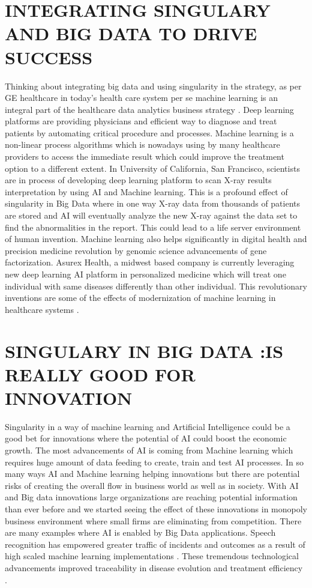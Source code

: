 \documentclass[sigconf]{acmart}
\begin{document}
\section{INTEGRATING SINGULARY AND BIG DATA TO DRIVE SUCCESS}
Thinking about integrating big data and using singularity in the strategy, as per GE healthcare in today’s health care system per se machine learning is an integral part of the healthcare data analytics business strategy \cite{editor02}. Deep learning platforms are providing physicians and efficient way to diagnose and treat patients by automating critical procedure and processes. Machine learning is a non-linear process algorithms which is nowadays using by many healthcare providers to access the immediate result which could improve the treatment option to a different extent. In University of California, San Francisco, scientists are in process of developing deep learning platform to scan X-ray results interpretation by using AI and Machine learning. This is a profound effect of singularity in Big Data where in one way X-ray data from thousands of patients are stored and AI will eventually analyze the new X-ray against the data set to find the abnormalities in the report. This could lead to a life server environment of human invention. Machine learning also helps significantly in digital health and precision medicine revolution by genomic science advancements of gene factorization. Asurex Health, a midwest based company is currently leveraging new deep learning AI platform in personalized medicine which will treat one individual with same diseases differently than other individual. This revolutionary inventions are some of the effects of modernization of machine learning in healthcare systems \cite{editor02}.

\section{SINGULARY IN BIG DATA :IS REALLY GOOD FOR INNOVATION}
Singularity in a way of machine learning and Artificial Intelligence could be a good bet for innovations where the potential of AI could boost the economic growth. The most advancements of AI is coming from Machine learning which requires huge amount of data feeding to create, train and test AI processes. In so many ways AI and Machine learning helping innovations but there are potential risks of creating the overall flow in business world as well as in society. With AI and Big data innovations large organizations are reaching potential information than ever before and we started seeing the effect of these innovations in monopoly business environment where small firms are eliminating from competition. There are many examples where AI is enabled by Big Data applications. Speech recognition  has empowered greater traffic of incidents and outcomes as a result of high scaled machine learning implementations \cite{editor03}. These tremendous technological advancements improved traceability in disease evolution and treatment efficiency \cite{editor03}.
\end{document}
